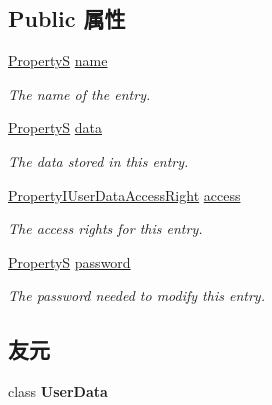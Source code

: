 \subsection*{Public 属性}
\begin{DoxyCompactItemize}
\item 
\hyperlink{classmv_i_m_p_a_c_t_1_1acquire_1_1_property_s}{Property\+S} \hyperlink{classmv_i_m_p_a_c_t_1_1acquire_1_1_user_data_entry_aa0eccb56a941b1237924d95f61460a21}{name}
\begin{DoxyCompactList}\small\item\em The name of the entry. \end{DoxyCompactList}\item 
\hyperlink{classmv_i_m_p_a_c_t_1_1acquire_1_1_property_s}{Property\+S} \hyperlink{classmv_i_m_p_a_c_t_1_1acquire_1_1_user_data_entry_a3dfca06b8c8b7368fd36382ddf95ac46}{data}
\begin{DoxyCompactList}\small\item\em The data stored in this entry. \end{DoxyCompactList}\item 
\hyperlink{group___common_interface_ga047125aae9705dc31db2e88a52f6422e}{Property\+I\+User\+Data\+Access\+Right} \hyperlink{classmv_i_m_p_a_c_t_1_1acquire_1_1_user_data_entry_a918aecd20592f81141f12d5ceeff17da}{access}
\begin{DoxyCompactList}\small\item\em The access rights for this entry. \end{DoxyCompactList}\item 
\hyperlink{classmv_i_m_p_a_c_t_1_1acquire_1_1_property_s}{Property\+S} \hyperlink{classmv_i_m_p_a_c_t_1_1acquire_1_1_user_data_entry_aae1a558c633261b0d2c72ab043421e83}{password}
\begin{DoxyCompactList}\small\item\em The password needed to modify this entry. \end{DoxyCompactList}\end{DoxyCompactItemize}
\subsection*{友元}
\begin{DoxyCompactItemize}
\item 
\hypertarget{classmv_i_m_p_a_c_t_1_1acquire_1_1_user_data_entry_aef1580ddee573cb02a996815d74cccfa}{class {\bfseries User\+Data}}\label{classmv_i_m_p_a_c_t_1_1acquire_1_1_user_data_entry_aef1580ddee573cb02a996815d74cccfa}

\end{DoxyCompactItemize}


